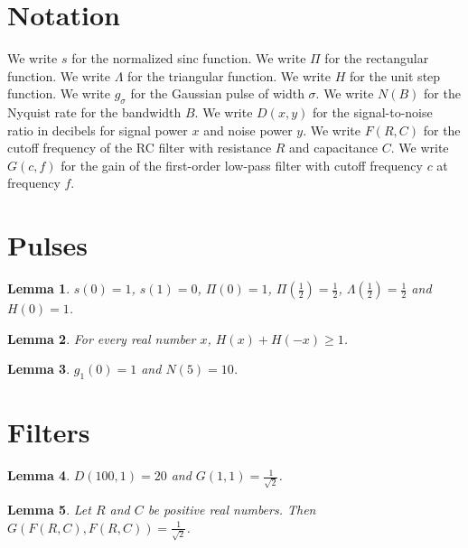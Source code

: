 \documentclass{article}
\newtheorem{lemma}{Lemma}
\begin{document}
\section{Notation}

We write $s$ for the normalized sinc function.
We write $\Pi$ for the rectangular function.
We write $\Lambda$ for the triangular function.
We write $H$ for the unit step function.
We write $g_\sigma$ for the Gaussian pulse of width $\sigma$.
We write $N(B)$ for the Nyquist rate for the bandwidth $B$.
We write $D(x,y)$ for the signal-to-noise ratio in decibels for signal power $x$ and noise power $y$.
We write $F(R,C)$ for the cutoff frequency of the RC filter with resistance $R$ and capacitance $C$.
We write $G(c,f)$ for the gain of the first-order low-pass filter with cutoff frequency $c$ at frequency $f$.

\section{Pulses}

\begin{lemma}\label{pulses}
$s(0)=1$, $s(1)=0$, $\Pi(0)=1$, $\Pi(\frac12)=\frac12$, $\Lambda(\frac12)=\frac12$ and $H(0)=1$.
\end{lemma}

\begin{lemma}\label{step}
For every real number $x$, $H(x)+H(-x)\ge1$.
\end{lemma}

\begin{lemma}\label{gauss}
$g_1(0)=1$ and $N(5)=10$.
\end{lemma}

\section{Filters}

\begin{lemma}\label{decibels}
$D(100,1)=20$ and $G(1,1)=\frac{1}{\sqrt{2}}$.
\end{lemma}

\begin{lemma}\label{cutoff}
Let $R$ and $C$ be positive real numbers. Then $G(F(R,C),F(R,C))=\frac{1}{\sqrt{2}}$.
\end{lemma}
\end{document}
